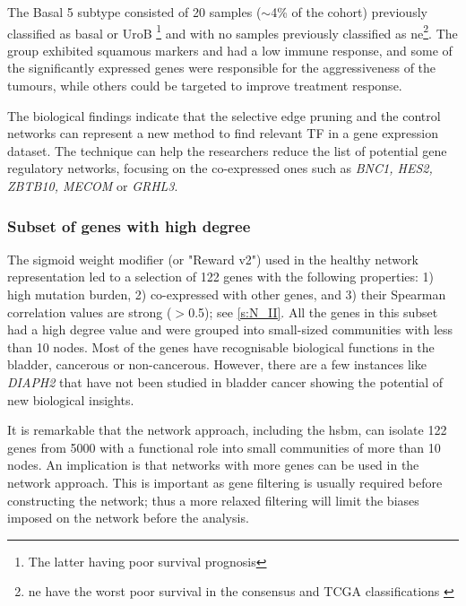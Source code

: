 The Basal 5 subtype consisted of 20 samples ($\sim$4\% of the cohort) previously classified as basal \citep{Kamoun2020-tj,Robertson2017-mg} or UroB \citep{Marzouka2018-ge}\footnote{The latter having poor survival prognosis} and with no samples previously classified as \acrlong{ne}\footnote{\acrlong{ne} have the worst poor survival in the consensus and TCGA classifications \citep{Kamoun2020-tj,Robertson2017-mg}}. The group exhibited squamous markers and had a low immune response, and some of the significantly expressed genes were responsible for the aggressiveness of the tumours, while others could be targeted to improve treatment response.

The biological findings indicate that the selective edge pruning and the control networks can represent a new method to find relevant \gls{TF} in a gene expression dataset. The technique can help the researchers reduce the list of potential gene regulatory networks, focusing on the co-expressed ones such as \textit{BNC1, HES2, ZBTB10, MECOM} or \textit{GRHL3}.

\subsubsection*{Subset of genes with high degree}

The sigmoid weight modifier (or "Reward v2") used in the healthy network representation led to a selection of 122 genes with the following properties: 1) high mutation burden, 2) co-expressed with other genes, and 3) their Spearman correlation values are strong (\(>\)0.5); see \cref{s:N_II}. All the genes in this subset had a high degree value and were grouped into small-sized communities with less than 10 nodes. Most of the genes have recognisable biological functions in the bladder, cancerous or non-cancerous. However, there are a few instances like \textit{DIAPH2} that have not been studied in bladder cancer showing the potential of new biological insights.

It is remarkable that the network approach, including the \acrshort{hsbm}, can isolate 122 genes from 5000 with a functional role into small communities of more than 10 nodes. An implication is that networks with more genes can be used in the network approach. This is important as gene filtering is usually required before constructing the network; thus a more relaxed filtering will limit the biases imposed on the network before the analysis.

